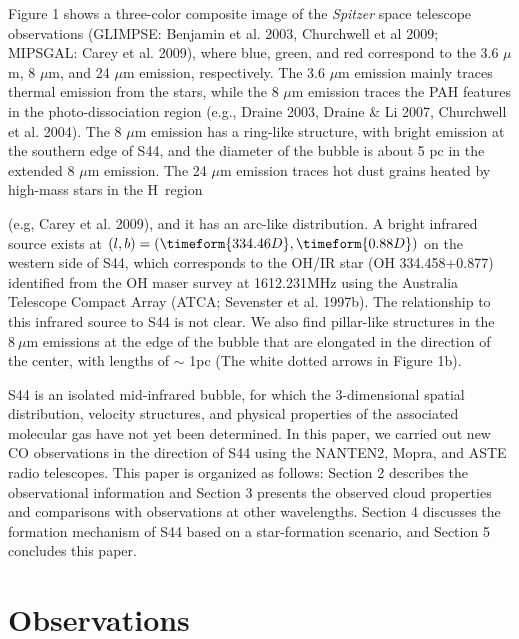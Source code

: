 \documentclass[onecolumn]{pasj01}
\begin{document}
Figure 1 shows a three-color composite image of the {\it Spitzer} space telescope observations (GLIMPSE: Benjamin et al. 2003, Churchwell et al 2009; MIPSGAL: Carey et al. 2009), where blue, green, and red correspond to the 3.6 $\mu$m, 8 $\mu$m, and 24 $\mu$m emission, respectively. 
The 3.6 $\mu$m emission mainly traces thermal emission from the stars, {while the 8 $\mu$m emission {traces {the} PAH features in the photo-dissociation region (e.g., Draine 2003, Draine \& Li 2007}, Churchwell et al. 2004). }
{The 8 $\mu$m emission} has  {a} ring-like structure{, with} bright emission {at} the southern edge of S44{, and the diameter of the bubble is about 5 pc in the extended 8 $\mu$m emission}.
The 24 $\mu$m emission traces {hot dust grain{s}} heated by high-mass stars in the H\, region {(e.g, Carey et al. 2009){, and it has an arc-like distribution.}
{A} bright infrared source exists at $(l,b)=(\timeform{334.46D}, \timeform{0.88D})$ {on the} western side of S44, which {corresponds to {the} OH/IR star (OH 334.458+0.877) identified {from} the {OH maser} survey {at 1612.231MHz} using the Australia Telescope Compact Array (ATCA; Sevenster et al. 1997b)}.
The relationship {to} this infrared source {to} S44 is not clear.
{We {also} find pillar-like structures in the $8\ \mu$m emissions at the edge of the bubble {that are} elongated {in} the direction of {the} center, with length{s} of $\sim$ 1pc ({The white dotted arrows in Figure 1b}).}

S44 is {an isolated} mid-infrared bubble, {for which} the {3-dimensional} spatial distribution, velocity structures, and physical properties {of} {the} associated molecular gas {have not {yet} been determined}.
In this paper, we carried out new CO observations {in the direction of} S44 {using} the NANTEN2, Mopra, and ASTE radio telescopes.
This paper is organized as follows: Section 2 describes {the} observational information and Section 3 {{presents the} observed cloud properties} and comparison{s} with {observations at} other wavelength{s}. Section 4 discusses {the} formation mechanism of S44 based on a star-formation scenario, and Section 5 concludes this paper.

\section{Observations}
}
\end{document}
